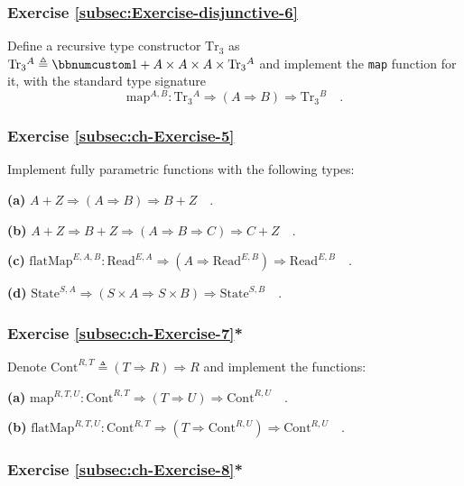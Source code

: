 \subsubsection{Exercise \label{subsec:Exercise-disjunctive-6}\ref{subsec:Exercise-disjunctive-6}}

Define a recursive type constructor $\text{Tr}_{3}$ as $\text{Tr}_{3}{}^{A}\triangleq\bbnum 1+A\times A\times A\times\text{Tr}_{3}{}^{A}$
and implement the \lstinline!map! function for it, with the standard
type signature
\[
\text{map}^{A,B}:\text{Tr}_{3}{}^{A}\Rightarrow\left(A\Rightarrow B\right)\Rightarrow\text{Tr}_{3}{}^{B}\quad.
\]


\subsubsection{Exercise \label{subsec:ch-Exercise-5}\ref{subsec:ch-Exercise-5}}

Implement fully parametric functions with the following types:

\textbf{(a)} $A+Z\Rightarrow(A\Rightarrow B)\Rightarrow B+Z\quad.$

\textbf{(b)} $A+Z\Rightarrow B+Z\Rightarrow(A\Rightarrow B\Rightarrow C)\Rightarrow C+Z\quad.$

\textbf{(c)} $\text{flatMap}^{E,A,B}:\text{Read}^{E,A}\Rightarrow(A\Rightarrow\text{Read}^{E,B})\Rightarrow\text{Read}^{E,B}\quad.$

\textbf{(d)} $\text{State}^{S,A}\Rightarrow\left(S\times A\Rightarrow S\times B\right)\Rightarrow\text{State}^{S,B}\quad.$

\subsubsection{Exercise \label{subsec:ch-Exercise-7}\ref{subsec:ch-Exercise-7}{*}}

Denote $\text{Cont}^{R,T}\triangleq\left(T\Rightarrow R\right)\Rightarrow R$
and implement the functions:

\textbf{(a)} $\text{map}^{R,T,U}:\text{Cont}^{R,T}\Rightarrow(T\Rightarrow U)\Rightarrow\text{Cont}^{R,U}\quad.$

\textbf{(b)} $\text{flatMap}^{R,T,U}:\text{Cont}^{R,T}\Rightarrow(T\Rightarrow\text{Cont}^{R,U})\Rightarrow\text{Cont}^{R,U}\quad.$

\subsubsection{Exercise \label{subsec:ch-Exercise-8}\ref{subsec:ch-Exercise-8}{*}}

